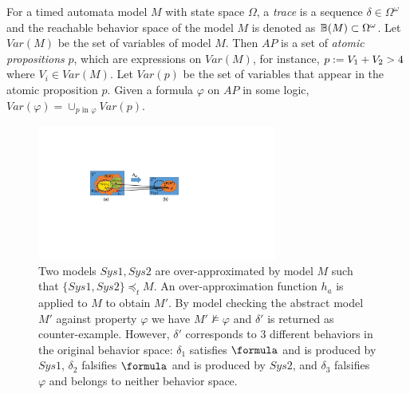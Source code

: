 For a timed automata model $M$ with state space $\Omega$, a \emph{trace} is a sequence $\delta\in \Omega^\omega$ and the reachable behavior space of the model $M$ is denoted as $\mathbb{B}(M)\subset \Omega^\omega$. 
Let $Var(M)$ be the set of variables of model $M$.
Then $AP$ is a set of \emph{atomic propositions} $p$, which are expressions on $Var(M)$, for instance, $p := V_1 + V_2 > 4$ where $V_i \in Var(M)$.
Let $Var(p)$ be the set of variables that appear in the atomic proposition $p$.
Given a formula $\varphi$ on $AP$ in some logic, $Var(\varphi) = \cup_{p \textrm{ in }\varphi} Var(p)$.
%


\begin{figure}[!t]
		\centering
		\includegraphics[width=0.7\textwidth]{figs/SysVSEnv.pdf}
		\caption{\small Two models $Sys1,Sys2$ are over-approximated by model $M$ such that $\{Sys1,Sys2\}\preceq_t M$. An over-approximation function $h_a$ is applied to $M$ to obtain $M'$. By model checking the abstract model $M'$ against property $\varphi$ we have $M'\not\models\varphi$ and $\delta'$ is returned as counter-example. However, $\delta'$ corresponds to 3 different behaviors in the original behavior space: $\delta_1$ satisfies $\formula$ and is produced by $Sys1$, $\delta_2$ falsifies $\formula$ and is produced by $Sys2$, and $\delta_3$ falsifies $\varphi$ and belongs to neither behavior space.}
		  \vspace{-15pt}
		\label{fig:ambiguity}
\end{figure}

